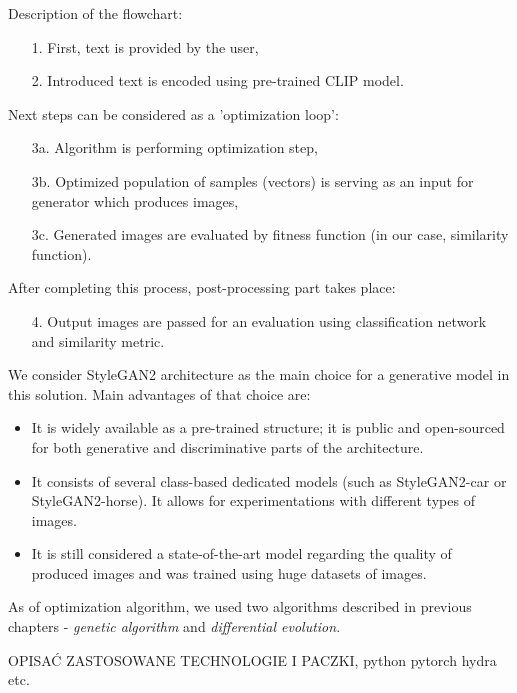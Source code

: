 \documentclass[12pt,a4paper,openany]{book}
\begin{document}
\noindent Description of the flowchart:
\begin{enumerate}
\item [1.] First, text is provided by the user,
\item [2.] Introduced text is encoded using pre-trained CLIP model.
\end{enumerate}
Next steps can be considered as a 'optimization loop':
\begin{enumerate}
\item [3a.] Algorithm is performing optimization step,
\item [3b.] Optimized population of samples (vectors)  is serving as an input for generator which produces images,
\item [3c.] Generated images are evaluated by fitness function (in our case, similarity function).
\end{enumerate}
After completing this process, post-processing part takes place:
\begin{enumerate}
\item [4.] Output images are passed for an evaluation using classification network and similarity metric.
\end{enumerate}

We consider StyleGAN2 architecture as the main choice for a generative model in this solution. Main advantages of that choice are:
\begin{itemize}
\item It is widely available as a pre-trained structure; it is public and open-sourced for both generative and discriminative parts of the architecture.
\item It consists of several class-based dedicated models (such as StyleGAN2-car or StyleGAN2-horse). It allows for experimentations with different types of images.
\item It is still considered a state-of-the-art model regarding the quality of produced images and was trained using huge datasets of images.
\end{itemize}

As of optimization algorithm, we used two algorithms described in previous chapters - \textit{genetic algorithm} and \textit{differential evolution}.



OPISAĆ ZASTOSOWANE TECHNOLOGIE I PACZKI, python pytorch hydra etc.
\end{document}
